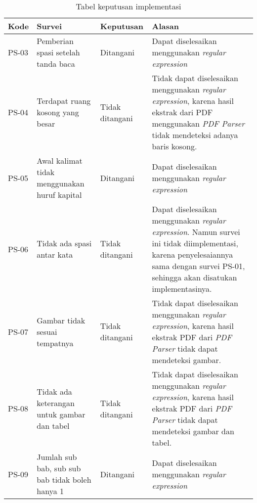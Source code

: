 \begin{table}[H]
	\renewcommand{\arraystretch}{1.5}
	\caption {Tabel keputusan implementasi} \label{tab:keputusan2}
	\begin{center}
		\begin{tabular}{|p{1.5 cm}|>{\raggedright} p{4.3 cm}| p{2.2 cm}| p{6.5 cm}|}
		\hline
		Kode & Survei & Keputusan & Alasan \\ 
		\hline 
		PS-03 & Pemberian spasi setelah tanda baca & Ditangani & Dapat diselesaikan menggunakan \textit{regular expression} \newline \\ 
		\hline 
		PS-04 & Terdapat ruang kosong yang besar & Tidak \newline ditangani & Tidak dapat diselesaikan menggunakan \textit{regular expression}, karena hasil ekstrak dari PDF menggunakan \textit{PDF Parser} tidak mendeteksi adanya baris kosong. \newline \\ 		
		\hline 
		PS-05 & Awal kalimat tidak menggunakan huruf kapital & Ditangani & Dapat diselesaikan menggunakan \textit{regular expression} \newline \\ 
		\hline
		PS-06 & Tidak ada spasi antar kata & Tidak \newline ditangani & Dapat diselesaikan menggunakan \textit{regular expression}. Namun survei ini tidak
diimplementasi, karena penyelesaiannya sama dengan survei PS-01, sehingga akan disatukan implementasinya. \newline \\ 
		\hline 
		PS-07 & Gambar tidak sesuai tempatnya & Tidak \newline ditangani & Tidak dapat diselesaikan menggunakan \textit{regular expression}, karena hasil ekstrak PDF dari \textit{PDF Parser} tidak dapat mendeteksi gambar. \newline \\ 
		\hline 
		PS-08 & Tidak ada keterangan untuk gambar dan tabel & Tidak \newline ditangani & Tidak dapat diselesaikan menggunakan \textit{regular expression}, karena hasil ekstrak PDF dari \textit{PDF Parser} tidak dapat mendeteksi gambar dan tabel. \newline \\ 
		\hline 
		PS-09 & Jumlah sub bab, sub sub bab tidak boleh hanya 1 & Ditangani & Dapat diselesaikan menggunakan \textit{regular expression} \newline \\ 

\end{tabular}
\end{center}
\end{table}
